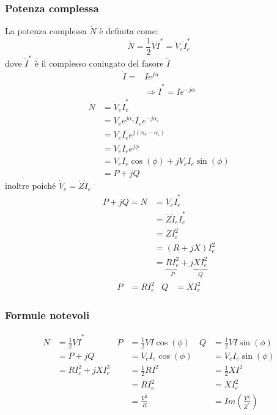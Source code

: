 \documentclass{article}
\begin{document}
\subsubsection{Potenza complessa}
La potenza complessa $\dot N$ è definita come:
\[\dot N = \frac{1}{2} \dot V \dot I^* = \dot V_e \dot I_e^*\]
dove $\dot I^*$ è il complesso coniugato del fasore $\dot I$
\begin{align*}
    \dot I =& I e^{j \alpha}
    \\
    &\Longrightarrow \dot I^* = I e^{-j \alpha}
\end{align*}
\begin{align*}
    \dot N &= \dot V_e \dot I_e^*\\
    &=V_ee^{j\alpha_v}I_e e^{-j \alpha_i} \\
    &=V_eI_e e^{j(\alpha_v-\alpha_i)}\\
    &=V_eI_e e^{j\phi}\\
    &= V_eI_e \cos(\phi) + jV_eI_e\sin(\phi)\\
    &= P+jQ
\end{align*}
inoltre poiché $\dot V_e=\dot Z \dot I_e$
\begin{align*}
    P+jQ=\dot N &= \dot V_e \dot I_e^*\\
    &=\dot Z \dot I_e\dot I_e^*\\
    &=\dot Z I_e^2\\
    &=(R+jX)I_e^2\\
    &=\underbrace{RI_e^2}_{P}+j\underbrace{XI_e^2}_{Q}
\end{align*}
\begin{align*}
    P &= RI_e^2 & Q &= XI_e^2
\end{align*}

\subsubsection{Formule notevoli}
\begin{align*}
    \dot N &= \frac{1}{2} \dot V \dot I^*
    &
    P &= \frac{1}{2}VI \cos(\phi)
    & 
    Q &= \frac{1}{2} VI \sin(\phi)
    \\
    &= P+jQ
    &
    &= V_eI_e \cos(\phi)
    &
    &=V_eI_e \sin(\phi)
    \\
    &=RI_e^2 + j XI_e^2
    &
    &= \frac{1}{2}RI^2
    &
    &= \frac{1}{2}XI^2
    \\
    & &
    &= RI_e^2
    &
    &= XI_e^2
    \\
    & &
    &=\frac{V^2}{R} &
    &=Im \left(\frac{V^2}{Z^*} \right)
\end{align*}
\end{document}
